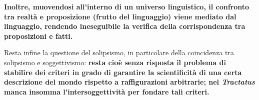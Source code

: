 \textbf{Inoltre, muovendosi all'interno di un universo linguistico, il confronto tra realtà e proposizione (frutto del linguaggio) viene mediato dal linguaggio, rendendo ineseguibile la verifica della corrispondenza tra proposizioni e fatti.}

Resta infine la questione del solipsismo, in particolare della coincidenza tra solipsismo e soggettivismo: \textbf{resta cioè senza risposta il problema di stabilire dei criteri in grado di garantire la scientificità di una certa descrizione del mondo rispetto a raffigurazioni arbitrarie; nel \textit{Tractatus} manca insomma  l'intersoggettività per fondare tali criteri.}
